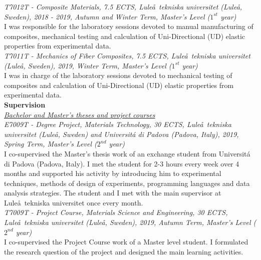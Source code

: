 \documentclass[
  a4paper, 
]{fortysecondscv}
\begin{document}
\textit{T7012T - Composite Materials, 7.5 ECTS, Lule\aa\ tekniska universitet (Lule\aa, Sweden), 2018 - 2019, Autumn and Winter Term, Master's Level ($1^{st}$ year)}\\
I was responsible for the laboratory sessions devoted to manual manufacturing of composites, mechanical testing and calculation of Uni-Directional (UD) elastic properties from experimental data.\\[6pt]
\textit{T7011T - Mechanics of Fiber Composites, 7.5 ECTS, Lule\aa\ tekniska universitet (Lule\aa, Sweden), 2019, Winter Term, Master's Level ($1^{st}$ year)}\\
I was in charge of the laboratory sessions devoted to mechanical testing of composites and calculation of Uni-Directional (UD) elastic properties from experimental data.\\[6pt]
\textbf{Supervision}\\[6pt]
\underline{\emph{Bachelor and Master's theses and project courses}}\\[6pt]
\textit{E7009T - Degree Project, Materials Technology, 30 ECTS, Lule\aa\ tekniska universitet (Lule\aa, Sweden) and Universit\'a di Padova (Padova, Italy), 2019, Spring Term, Master's Level ($2^{nd}$ year)}\\
I co-supervised the Master's thesis work of an exchange student from Universit\'a di Padova (Padova, Italy). I met the student for 2-3 hours every week over 4 months and supported his activity by introducing him to experimental techniques, methods of design of experiments, programming languages and data analysis strategies. The student and I met with the main supervisor at Lule\aa\ tekniska universitet once every month.\\[6pt]
\textit{T7009T - Project Course, Materials Science and Engineering, 30 ECTS, Lule\aa\ tekniska universitet (Lule\aa, Sweden), 2019, Autumn Term, Master's Level ($2^{nd}$ year)}\\
I co-supervised the Project Course work of a Master level student. I formulated the research question of the project and designed the main learning activities.\\

\newpage
\makebacksidebar
\hrulefill\hspace{5pt}\textbf{\thepage}
\end{document}
